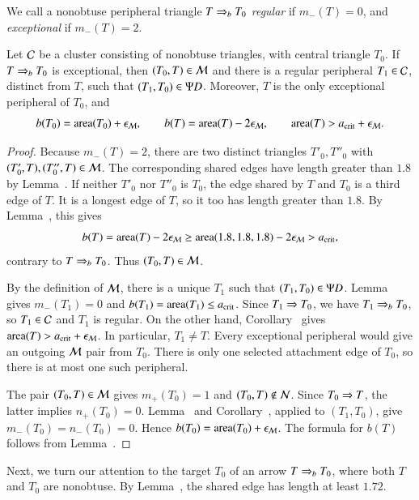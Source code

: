We call a nonobtuse peripheral triangle $T\Rightarrow_{b} T_0$ \emph{regular}
if $m_-(T)=0$, and \emph{exceptional} if $m_-(T)=2$.

\begin{lemma}
  Let $\mathcal C$ be a cluster consisting of nonobtuse triangles, with
  central triangle $T_0$. If $T\Rightarrow_{b} T_0$ is exceptional, then
  $(T_0,T)\in\mathcal M$ and there is a regular peripheral $T_1\in\mathcal C$,
  distinct from $T$, such that $(T_1,T_0)\in\Psi D$. Moreover, $T$ is
  the only exceptional peripheral of $T_0$, and
  \[
  b(T_0)={\operatorname{area}}(T_0)+\epsilon_{\mathcal M},\qquad
  b(T)={\operatorname{area}}(T)-2\epsilon_{\mathcal M},\qquad
  {\operatorname{area}}(T)>a_\text{crit}+\epsilon_{\mathcal M}.
  \]
\end{lemma}

\begin{proof}
  Because $m_-(T)=2$, there are two distinct triangles $T'_0,T''_0$
  with $(T'_0,T),(T''_0,T)\in\mathcal M$. The corresponding shared edges have
  length greater than $1.8$ by Lemma~. If
  neither $T'_0$ nor $T''_0$ is $T_0$, the edge shared by $T$ and $T_0$ is a
  third edge of $T$. It is a longest edge of $T$, so it too has
  length greater than $1.8$. By Lemma~, this gives
  \[
  b(T)={\operatorname{area}}(T)-2\epsilon_{\mathcal M}
  \ge{\operatorname{area}}(1.8,1.8,1.8)-2\epsilon_{\mathcal M}>a_\text{crit},
  \]
  contrary to $T\Rightarrow_{b} T_0$. Thus $(T_0,T)\in\mathcal M$.

  By the definition of $\mathcal M$, there is a unique $T_1$ such that
  $(T_1,T_0)\in\Psi D$. Lemma~ gives
  $m_-(T_1)=0$ and $b(T_1)={\operatorname{area}}(T_1)\le a_\text{crit}$. Since $T_1\Rightarrow T_0$,
  we have $T_1\Rightarrow_{b} T_0$, so $T_1\in\mathcal C$ and $T_1$ is regular. On the
  other hand, Corollary~ gives
  ${\operatorname{area}}(T)>a_\text{crit}+\epsilon_{\mathcal M}$. In particular, $T_1\ne T$.
  Every exceptional peripheral would give an outgoing $\mathcal M$ pair
  from $T_0$. There is only one selected attachment edge of $T_0$,
  so there is at most one such peripheral.

  The pair $(T_0,T)\in\mathcal M$ gives $m_+(T_0)=1$ and
  $(T_0,T)\notin\mathcal N$. Since $T_0\Rightarrow T$, the latter implies
  $n_+(T_0)=0$. Lemma~ and
  Corollary~, applied to $(T_1,T_0)$, give
  $m_-(T_0)=n_-(T_0)=0$. Hence $b(T_0)={\operatorname{area}}(T_0)+\epsilon_{\mathcal M}$.
  The formula for $b(T)$ follows from Lemma~.
\end{proof}

Next, we turn our attention to the target $T_0$ of an arrow $T\Rightarrow_{b} T_0$,
where both $T$ and $T_0$ are nonobtuse.  By
Lemma~, the shared edge has length at least
$1.72$.

